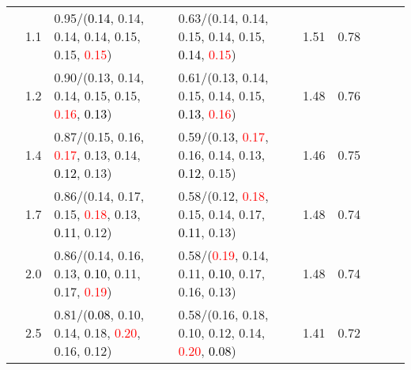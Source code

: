 \documentclass[10pt,a4paper]{report}
\begin{document}
\begin{table}[!htbp]
\begin{center}
{\begin{tabular}{ccllccccc}
				  & 1.1                               & 0.95/(\textcolor{black}{0.14}, 0.14, 0.14, 0.14, 0.15, 0.15, \textcolor{red}{0.15})                                                                                                           & 0.63/(0.14, 0.14, 0.15, 0.14, 0.15, \textcolor{black}{0.14}, \textcolor{red}{0.15})                                                                                                           & 1.51             & 0.78                     \\
				  & 1.2                               & 0.90/(0.13, 0.14, 0.14, 0.15, 0.15, \textcolor{red}{0.16}, \textcolor{black}{0.13})                                                                                                           & 0.61/(0.13, 0.14, 0.15, 0.14, 0.15, \textcolor{black}{0.13}, \textcolor{red}{0.16})                                                                                                           & 1.48             & 0.76                     \\
				  & 1.4                               & 0.87/(0.15, 0.16, \textcolor{red}{0.17}, 0.13, 0.14, \textcolor{black}{0.12}, 0.13)                                                                                                           & 0.59/(0.13, \textcolor{red}{0.17}, 0.16, 0.14, 0.13, \textcolor{black}{0.12}, 0.15)                                                                                                           & 1.46             & 0.75                     \\
				  & 1.7                               & 0.86/(0.14, 0.17, 0.15, \textcolor{red}{0.18}, 0.13, \textcolor{black}{0.11}, 0.12)                                                                                                           & 0.58/(0.12, \textcolor{red}{0.18}, 0.15, 0.14, 0.17, \textcolor{black}{0.11}, 0.13)                                                                                                           & 1.48             & 0.74                     \\
				  & 2.0                               & 0.86/(0.14, 0.16, 0.13, \textcolor{black}{0.10}, 0.11, 0.17, \textcolor{red}{0.19})                                                                                                           & 0.58/(\textcolor{red}{0.19}, 0.14, 0.11, \textcolor{black}{0.10}, 0.17, 0.16, 0.13)                                                                                                           & 1.48             & 0.74                     \\
				  & 2.5                               & 0.81/(\textcolor{black}{0.08}, 0.10, 0.14, 0.18, \textcolor{red}{0.20}, 0.16, 0.12)                                                                                                           & 0.58/(0.16, 0.18, 0.10, 0.12, 0.14, \textcolor{red}{0.20}, \textcolor{black}{0.08})                                                                                                           & 1.41             & 0.72                     \\

\end{tabular}}
\end{center}
\end{table}
\end{document}
